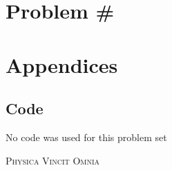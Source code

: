 \documentclass[12pt,a4paper]{article}
\begin{document}
	
	\section*{
		Problem \#
	}
	\begin{problem}

	\end{problem}
	\begin{solution_pset}

	\end{solution_pset}
	\newpage

	 
	 
	\section*{Appendices}
		\label{appendix}
		\subsection*{Code} 
		No code was used for this problem set
	\vfill
	\begin{center}
		\textsc{Physica Vincit Omnia}
	\end{center}
\end{document}
